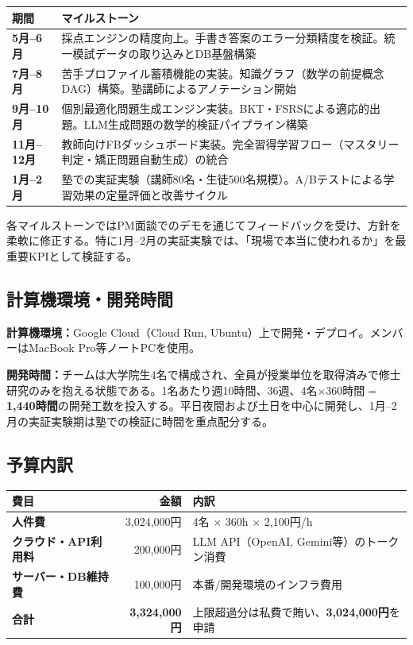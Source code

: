\documentclass[paper=a4,fontsize=10.5bp,jafontsize=10.5bp,twocolumn]{jlreq}
\begin{document}
\begin{footnotesize}\noindent
\begin{tabularx}{\linewidth}{>{\bfseries}l X}
\toprule
期間 & マイルストーン \\
\midrule
5月--6月 & 採点エンジンの精度向上。手書き答案のエラー分類精度を検証。統一模試データの取り込みとDB基盤構築 \\
7月--8月 & 苦手プロファイル蓄積機能の実装。知識グラフ（数学の前提概念DAG）構築。塾講師によるアノテーション開始 \\
9月--10月 & 個別最適化問題生成エンジン実装。BKT・FSRSによる適応的出題。LLM生成問題の数学的検証パイプライン構築 \\
11月--12月 & 教師向けFBダッシュボード実装。完全習得学習フロー（マスタリー判定・矯正問題自動生成）の統合 \\
1月--2月 & 塾での実証実験（講師80名・生徒500名規模）。A/Bテストによる学習効果の定量評価と改善サイクル \\
\bottomrule
\end{tabularx}
\end{footnotesize}

\noindent
各マイルストーンではPM面談でのデモを通じてフィードバックを受け、方針を柔軟に修正する。特に1月--2月の実証実験では、「現場で本当に使われるか」を最重要KPIとして検証する。

\subsection{計算機環境・開発時間}

\noindent\textbf{計算機環境：}Google Cloud（Cloud Run, Ubuntu）上で開発・デプロイ。メンバーはMacBook Pro等ノートPCを使用。

\noindent\textbf{開発時間：}チームは大学院生4名で構成され、全員が授業単位を取得済みで修士研究のみを抱える状態である。1名あたり週10時間、36週、4名$\times$360時間$=$\textbf{1,440時間}の開発工数を投入する。平日夜間および土日を中心に開発し、1月--2月の実証実験期は塾での検証に時間を重点配分する。

\subsection{予算内訳}

\begin{footnotesize}\noindent
\begin{tabularx}{\linewidth}{>{\bfseries}l r X}
\toprule
費目 & 金額 & 内訳 \\
\midrule
人件費 & 3,024,000円 & 4名 $\times$ 360h $\times$ 2,100円/h \\
クラウド・API利用料 & 200,000円 & LLM API（OpenAI, Gemini等）のトークン消費 \\
サーバー・DB維持費 & 100,000円 & 本番/開発環境のインフラ費用 \\
\midrule
\textbf{合計} & \textbf{3,324,000円} & 上限超過分は私費で賄い、\textbf{3,024,000円}を申請 \\
\bottomrule
\end{tabularx}
\end{footnotesize}
\end{document}
